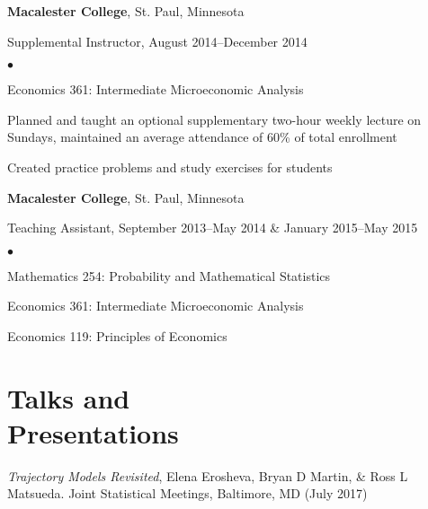 \documentclass[margin,centered]{res}
\newenvironment{list1}{
  \begin{list}{\ding{113}}{%
      \setlength{\itemsep}{0in}
      \setlength{\parsep}{0in} \setlength{\parskip}{0in}
      \setlength{\topsep}{0in} \setlength{\partopsep}{0in}
      \setlength{\leftmargin}{0.17in}}}{\end{list}}
\newenvironment{list2}{
  \begin{list}{$\bullet$}{%
      \setlength{\itemsep}{0in}
      \setlength{\parsep}{0in} \setlength{\parskip}{0in}
      \setlength{\topsep}{0in} \setlength{\partopsep}{0in}
      \setlength{\leftmargin}{0.2in}}}{\end{list}}
\begin{document}
\begin{resume}
{\bf Macalester College}, St. Paul, Minnesota
\begin{list1}
\item[] Supplemental Instructor, August 2014--December 2014
\begin{list2}
\vspace*{.05in}
\item Economics 361: Intermediate Microeconomic Analysis
\item Planned and taught an optional supplementary two-hour weekly lecture on Sundays, maintained an average attendance of 60\% of total enrollment
\item Created practice problems and study exercises for students
\end{list2}
\end{list1}

{\bf Macalester College}, St. Paul, Minnesota
\begin{list1}
\item[] Teaching Assistant, September 2013--May 2014 \& January 2015--May 2015
\begin{list2}
\vspace*{.05in}
\item Mathematics 254: Probability and Mathematical Statistics
\item Economics 361: Intermediate Microeconomic Analysis
\item Economics 119: Principles of Economics
\end{list2}
\end{list1}




\section{\sc Talks and \\ Presentations}
\emph{Trajectory Models Revisited}, Elena Erosheva, Bryan D Martin, \& Ross L Matsueda. Joint Statistical Meetings, Baltimore, MD (July 2017)



\end{resume}
\end{document}
